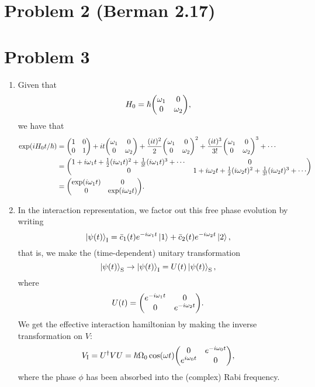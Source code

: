 \documentclass[12pt]{article}
\begin{document}
\section*{Problem 2 {\small (Berman 2.17)}}

\section*{Problem 3}
\begin{enumerate}[label=(\alph*)]
    \item Given that
    \[ H_0 = \hbar\mqty(\omega_1&0\\0&\omega_2), \]
    we have that
    \begin{align*}
        \exp(iH_0t/\hbar) &= \mqty(1&0\\0&1) + it\mqty(\omega_1&0\\0&\omega_2) + \frac{(it)^2}{2}\mqty(\omega_1&0\\0&\omega_2)^2 + \frac{(it)^3}{3!}\mqty(\omega_1&0\\0&\omega_2)^3 + \cdots \\
        &= \mqty(1 + i\omega_1t + \frac{1}{2}(i\omega_1t)^2 + \frac{1}{3!}(i\omega_1 t)^3 + \cdots & 0 \\ 0 & 1 + i\omega_2t + \frac{1}{2}(i\omega_2t)^2 + \frac{1}{3!}(i\omega_2t)^3 + \cdots) \\
        &= \mqty(\exp(i\omega_1t)&0\\0&\exp(i\omega_2t)).
    \end{align*}

    \item In the interaction representation, we factor out this free phase evolution by writing
    \[ \ket{\psi(t)}_\text{I} = \bar{c}_1(t)e^{-i\omega_1t}\ket{1} + \bar{c}_2(t)e^{-i\omega_2t}\ket{2}, \]
    that is, we make the (time-dependent) unitary transformation
    \[ \ket{\psi(t)}_\text{S} \to \ket{\psi(t)}_\text{I} = U(t)\ket{\psi(t)}_\text{S}, \]
    where
    \[ U(t) = \mqty(e^{-i\omega_1t}&0\\0&e^{-i\omega_2t}). \] 
    We get the effective interaction hamiltonian by making the inverse transformation on $V$:
    \[ V_\text{I} = U^\dag VU = \hbar\Omega_0 \cos(\omega t) \mqty(0&e^{-i\omega_0t}\\e^{i\omega_0t}&0), \]
    where the phase $\phi$ has been absorbed into the (complex) Rabi frequency.
\end{enumerate}
\end{document}
